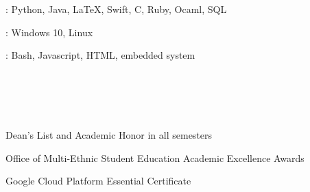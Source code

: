 \documentclass{resume}
\newif\ifen
\newif\ifzh
\newif\ifboth
\newcommand{\en}[1]{\ifen#1\fi}
\newcommand{\zh}[1]{\ifzh#1\fi}
\newcommand{\both}[1]{\ifboth#1\fi}
\begin{document}
    \en{\datedsubsection{University of Maryland}{Oct. 2019 -- Jul. 2020}}
    \zh{\datedsubsection{美国马里兰大学}{2019年10月 -- 2020年7月}}
    \en{\role{Student Driver}{Shuttle UM}}
    \zh{\role{学生司机}{}}
    \en{I am a student shuttle driver at University shuttle team. I acquired Commercial Driver's License through rigorous training in my spare time. 
    This is a demonstration of my punctuality and public service ability.}\both{\newline}
    \zh{我是马里兰大学校车的一名司机，经过严格的训练，我在课余时间考到了商用B级驾照。这份工作体现了我的守时的个性与为公众服务的理想。}

    \en{\datedsubsection{University of Maryland}{Sep. 2018 -- Dec. 2019}}
    \zh{\datedsubsection{美国马里兰大学}{2018年9月 -- 2019年12月}}
    \en{\role{Research Assistant}{Department of Human Development and Quantitative Methodology}}
    \zh{\role{研究助理}{}}
    \en{Data entry, literature review and basic data compiling for cognitive diagnosis modeling.}\both{\newline}
    \zh{为认知分析建模进行数据输入，文学评估与数据分析。}

    \section{\faCogs\ \en{Skills}\both{ }\zh{技能}}
    \begin{myitemize}
        \item \en{Programming Languages}\both{ }\zh{编程语言}: Python, Java, \LaTeX, Swift, C, Ruby, Ocaml, SQL
        \item \en{Platform}\both{ }\zh{平台}: Windows 10, Linux
        \item \en{Others}\both{ }\zh{其他}: Bash, Javascript, HTML, embedded system
    \end{myitemize}

    \section{\faHeartO\ \en{Honors \& Certificates}\both{ }\zh{荣誉与证书}}
    \begin{myitemize}
        \item Dean's List and Academic Honor in all semesters
        \item Office of Multi-Ethnic Student Education Academic Excellence Awards
        \item Google Cloud Platform Essential Certificate
    \end{myitemize}
\end{document}
